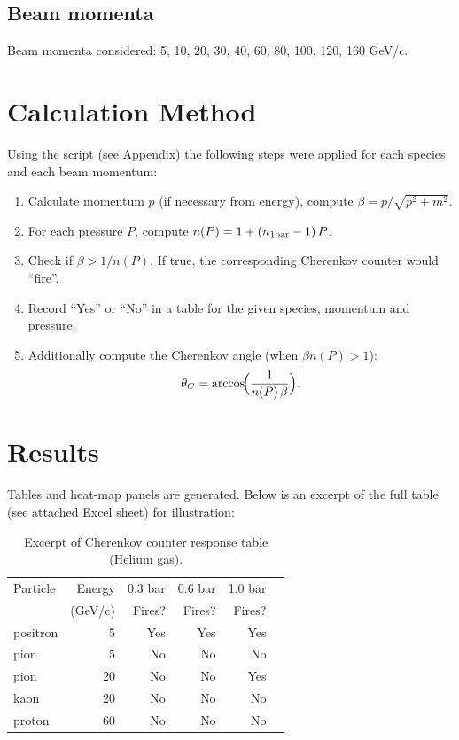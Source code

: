 \documentclass[11pt,a4paper]{article}
\begin{document}
\subsection{Beam momenta}
Beam momenta considered: 5, 10, 20, 30, 40, 60, 80, 100, 120, 160 GeV/c.

\section{Calculation Method}
Using the script (see Appendix) the following steps were applied for each species and each beam momentum:
\begin{enumerate}
  \item Calculate momentum $p$ (if necessary from energy), compute $\beta = p/\sqrt{p^2+m^2}$.  
  \item For each pressure $P$, compute $n(P) = 1 + (n_{1\rm bar}-1)\,P$.  
  \item Check if $\beta > 1/n(P)$. If true, the corresponding Cherenkov counter would ``fire''.  
  \item Record ``Yes'' or ``No'' in a table for the given species, momentum and pressure.  
  \item Additionally compute the Cherenkov angle (when $\beta n(P) > 1$):
    \[
      \theta_C = \arccos\!\Bigl(\frac{1}{n(P)\,\beta}\Bigr).
    \]
\end{enumerate}

\section{Results}
Tables and heat-map panels are generated. Below is an excerpt of the full table (see attached Excel sheet) for illustration:

\begin{table}[h!]
\centering
\begin{tabular}{lrrrrr}
\toprule
Particle & Energy & 0.3 bar & 0.6 bar & 1.0 bar \\
 & (GeV/c) & Fires? & Fires? & Fires? \\
\midrule
positron & 5   & Yes & Yes & Yes \\
pion     & 5   & No  & No  & No  \\
pion     & 20  & No  & No  & Yes \\
kaon     & 20  & No  & No  & No  \\
proton   & 60  & No  & No  & No  \\
\bottomrule
\end{tabular}
\caption{Excerpt of Cherenkov counter response table (Helium gas).}
\end{table}
\end{document}
